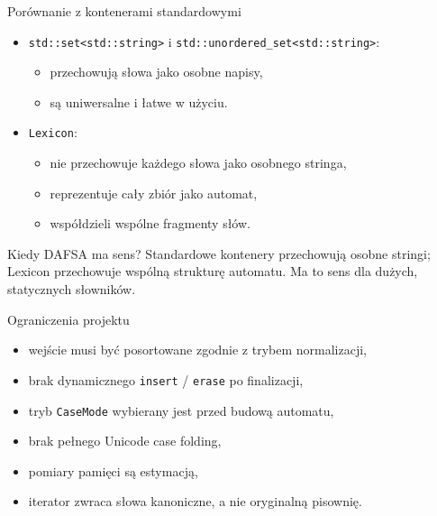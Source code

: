 \documentclass{beamer}
\begin{document}
\begin{frame}{Porównanie z kontenerami standardowymi}
    \begin{itemize}
        \item \texttt{std::set<std::string>} i \texttt{std::unordered\_set<std::string>}:
              \begin{itemize}
                  \item przechowują słowa jako osobne napisy,
                  \item są uniwersalne i łatwe w użyciu.
              \end{itemize}

        \item \texttt{Lexicon}:
              \begin{itemize}
                  \item nie przechowuje każdego słowa jako osobnego stringa,
                  \item reprezentuje cały zbiór jako automat,
                  \item współdzieli wspólne fragmenty słów.
              \end{itemize}
    \end{itemize}

    \begin{block}{Kiedy DAFSA ma sens?}
        Standardowe kontenery przechowują osobne stringi; Lexicon przechowuje wspólną strukturę automatu. Ma to sens dla dużych, statycznych słowników.
    \end{block}
\end{frame}

\begin{frame}{Ograniczenia projektu}
    \begin{itemize}
        \item wejście musi być posortowane zgodnie z trybem normalizacji,
        \item brak dynamicznego \texttt{insert} / \texttt{erase} po finalizacji,
        \item tryb \texttt{CaseMode} wybierany jest przed budową automatu,
        \item brak pełnego Unicode case folding,
        \item pomiary pamięci są estymacją,
        \item iterator zwraca słowa kanoniczne, a nie oryginalną pisownię.
    \end{itemize}
\end{frame}
\end{document}
